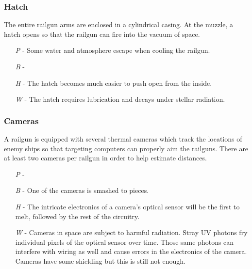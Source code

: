 \documentclass[a4paper]{article}
\begin{document}
\vspace{-0.5cm} \hspace{-18pt} \subsubsection{Hatch} \label{railgun_hatch} \vspace{-0.2cm}
The entire railgun arms are enclosed in a cylindrical casing. At the muzzle, a hatch opens so that the railgun can fire into the vacuum of space. 
\begin{enumerate}
\item [\textit{P}] - Some water and atmosphere escape when cooling the railgun.
\item [\textit{B}] -  \\
\item [\textit{H}] - The hatch becomes much easier to push open from the inside.
\item [\textit{W}] - The hatch requires lubrication and decays under stellar radiation.
\end{enumerate}

\vspace{-0.5cm} \hspace{-18pt} \subsubsection{Cameras} \label{railgun_cameras} \vspace{-0.2cm}
A railgun is equipped with several thermal cameras which track the locations of enemy ships so that targeting computers can properly aim the railguns. There are at least two cameras per railgun in order to help estimate distances.
\begin{enumerate}
\item [\textit{P}] -  \\
\item [\textit{B}] - One of the cameras is smashed to pieces.
\item [\textit{H}] - The intricate electronics of a camera's optical sensor will be the first to melt, followed by the rest of the circuitry.
\item [\textit{W}] - Cameras in space are subject to harmful radiation. Stray UV photons fry individual pixels of the optical sensor over time. Those same photons can interfere with wiring as well and cause errors in the electronics of the camera. Cameras have some shielding but this is still not enough.
\end{enumerate}
\end{document}

